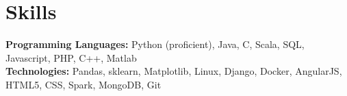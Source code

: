 \documentclass[letterpaper,11pt]{article}
\newcommand{\resumeListStart}{\begin{itemize}[label={},leftmargin=*]}
\newcommand{\resumeListEnd}{\end{itemize}}
\begin{document}
        
        \section{Skills}
        \textbf{Programming Languages:} {\space Python (proficient), Java, C, Scala, SQL, Javascript, PHP, C++, Matlab}\\
        \textbf{Technologies:} {\space Pandas, sklearn, Matplotlib, Linux, Django, Docker, AngularJS, HTML5, CSS, Spark, MongoDB, Git}\\
              
      
\end{document}
